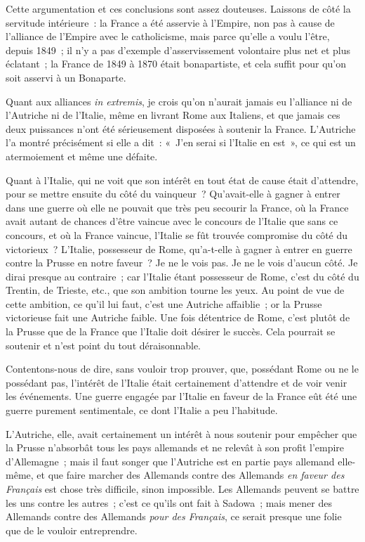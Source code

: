 \documentclass[french,twoside]{book} %
\begin{document}
Cette argumentation et ces conclusions sont assez douteuses. Laissons de côté la servitude intérieure : la France a été asservie à l’Empire, non pas à cause de l’alliance de l’Empire avec le catholicisme, mais parce qu’elle a voulu l’être, depuis 1849 ; il n’y a pas d’exemple d’asservissement volontaire plus net et plus éclatant ; la France de 1849 à 1870 était bonapartiste, et cela suffit pour qu’on soit asservi à un Bonaparte.\par
Quant aux alliances {\itshape in extremis}, je crois qu’on n’aurait jamais eu l’alliance ni de l’Autriche ni de l’Italie, même en livrant Rome aux Italiens, et que jamais ces deux puissances n’ont été sérieusement disposées à soutenir la France. L’Autriche l’a montré précisément si elle a dit : « J’en serai si l’Italie en est », ce qui est un atermoiement et même une défaite.\par
Quant à l’Italie, qui ne voit que son intérêt en tout état de cause était d’attendre, pour se mettre ensuite du côté du vainqueur ? Qu’avait-elle à gagner à entrer dans une guerre où elle ne pouvait que  très peu secourir la France, où la France avait autant de chances d’être vaincue avec le concours de l’Italie que sans ce concours, et où la France vaincue, l’Italie se fût trouvée compromise du côté du victorieux ? L’Italie, possesseur de Rome, qu’a-t-elle à gagner à entrer en guerre contre la Prusse en notre faveur ? Je ne le vois pas. Je ne le vois d’aucun côté. Je dirai presque au contraire ; car l’Italie étant possesseur de Rome, c’est du côté du Trentin, de Trieste, etc., que son ambition tourne les yeux. Au point de vue de cette ambition, ce qu’il lui faut, c’est une Autriche affaiblie ; or la Prusse victorieuse fait une Autriche faible. Une fois détentrice de Rome, c’est plutôt de la Prusse que de la France que l’Italie doit désirer le succès. Cela pourrait se soutenir et n’est point du tout déraisonnable.\par
Contentons-nous de dire, sans vouloir trop prouver, que, possédant Rome ou ne le possédant pas, l’intérêt de l’Italie était certainement d’attendre et de voir venir les événements. Une guerre engagée par l’Italie en faveur de la France eût été une guerre purement sentimentale, ce dont l’Italie a peu l’habitude.\par
L’Autriche, elle, avait certainement un intérêt à nous soutenir pour empêcher que la Prusse n’absorbât tous les pays allemands et ne relevât à son  profit l’empire d’Allemagne ; mais il faut songer que l’Autriche est en partie pays allemand elle-même, et que faire marcher des Allemands contre des Allemands {\itshape en faveur des Français} est chose très difficile, sinon impossible. Les Allemands peuvent se battre les uns contre les autres ; c’est ce qu’ils ont fait à Sadowa ; mais mener des Allemands contre des Allemands {\itshape pour des Français}, ce serait presque une folie que de le vouloir entreprendre.\par
\end{document}
